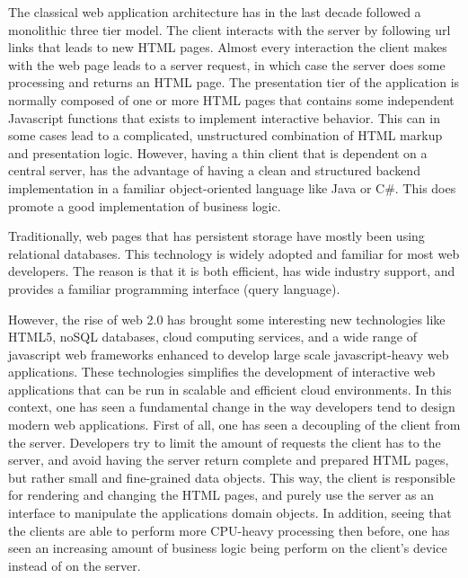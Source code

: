The classical web application architecture has in the last
        decade followed a monolithic three tier model. The client interacts
        with the server by following url links that leads to new HTML pages. 
        Almost every interaction the client makes with the web page
        leads to a server request, in which case the server does some processing
        and returns an HTML page. The presentation tier of the application is 
        normally composed of one or more HTML pages that contains some
        independent Javascript functions that exists to implement interactive behavior.
        This can in some cases lead to a complicated, unstructured combination of HTML
        markup and presentation logic. However, having a thin client that is dependent on a 
        central server, has the advantage of having a clean and structured backend
        implementation in a familiar object-oriented language like Java or C\#. This
        does promote a good implementation of business logic. 
        
        Traditionally, web pages that has persistent storage have mostly been
        using relational databases. This technology is widely adopted and familiar
        for most web developers. The reason is that it is both efficient, has wide
        industry support, and provides a familiar programming interface (query language).
        
        However, the rise of web 2.0 has brought some interesting new technologies like HTML5,
        noSQL databases, cloud computing services, and a wide range of
        javascript web frameworks enhanced to develop large scale javascript-heavy web applications.
        These technologies simplifies the development of interactive web
        applications that can be run in scalable and efficient cloud
        environments. In this context, one has seen a fundamental
        change in the way developers tend to design modern web
        applications. First of all, one has seen a decoupling of the client from the server.
        Developers try to limit the amount of requests the client has to the server, and 
        avoid having the server return complete and prepared HTML pages, but rather
        small and fine-grained data objects. This way, the client
        is responsible for rendering and changing the HTML pages, and purely use 
        the server as an interface to manipulate the applications domain objects.        
        In addition, seeing that the clients are able to perform more CPU-heavy
        processing then before, one has seen an increasing amount of business logic
        being perform on the client's device instead of on the server. 
        
